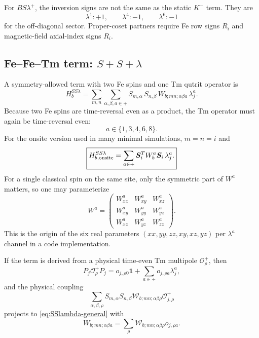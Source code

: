 \documentclass[11pt,a4paper]{article}
\newcommand{\ve}[1]{\boldsymbol{#1}}
\begin{document}
\begin{implbox}
For $B S\lambda^+$, the inversion signs are not the same as the static $K^-$ term.  They are
\begin{equation}
  \lambda^1:+1,
  \qquad
  \lambda^4:-1,
  \qquad
  \lambda^6:-1
\end{equation}
for the off-diagonal sector.  Proper-coset partners require Fe row signs $R_i$ and magnetic-field axial-index signs $R_i$.
\end{implbox}

\subsection{Fe--Fe--Tm term: $S+S+\lambda$}

A symmetry-allowed term with two Fe spins and one Tm qutrit operator is
\begin{equation}
  \boxed{
  H^{SS\lambda}_{b}
  =\sum_{m,n}\sum_{\alpha,\beta,a\in+}
  S_{m,\alpha}\,S_{n,\beta}\,
  W_{b;mn;\alpha\beta a}\,\lambda_j^a.}
  \label{eq:SSlambda-general}
\end{equation}
Because two Fe spins are time-reversal even as a product, the Tm operator must again be time-reversal even:
\begin{equation}
  a\in\{1,3,4,6,8\}.
\end{equation}
For the onsite version used in many minimal simulations, $m=n=i$ and
\begin{equation}
  \boxed{
  H^{SS\lambda}_{b,\rm onsite}
  =\sum_{a\in+}\ve S_i^T W^a_b\ve S_i\,\lambda_j^a.}
  \label{eq:SSlambda-onsite}
\end{equation}
For a single classical spin on the same site, only the symmetric part of $W^a$ matters, so one may parameterize
\begin{equation}
  W^a=
  \begin{pmatrix}
    W^a_{xx}&W^a_{xy}&W^a_{xz}\\
    W^a_{xy}&W^a_{yy}&W^a_{yz}\\
    W^a_{xz}&W^a_{yz}&W^a_{zz}
  \end{pmatrix}.
\end{equation}
This is the origin of the six real parameters $(xx,yy,zz,xy,xz,yz)$ per $\lambda^a$ channel in a code implementation.

If the term is derived from a physical time-even Tm multipole $\mathcal O^+_\rho$, then
\begin{equation}
  P_j\mathcal O^+_\rho P_j
  =o_{j,\rho0}\mathbf1+
  \sum_{a\in+}o_{j,\rho a}\lambda_j^a,
\end{equation}
and the physical coupling
\begin{equation}
  \sum_{\alpha,\beta,\rho}S_{m,\alpha}S_{n,\beta}
  \mathcal W_{b;mn;\alpha\beta\rho}\mathcal O^+_{j,\rho}
\end{equation}
projects to \cref{eq:SSlambda-general} with
\begin{equation}
  \boxed{
  W_{b;mn;\alpha\beta a}
  =\sum_\rho \mathcal W_{b;mn;\alpha\beta\rho}o_{j,\rho a}.}
\end{equation}
\end{document}
